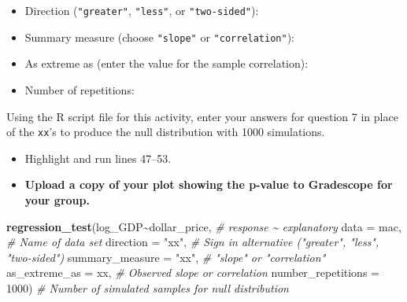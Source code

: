 \documentclass[
]{report}
\newenvironment{Shaded}{\begin{snugshade}}{\end{snugshade}}
\newcommand{\AttributeTok}[1]{\textcolor[rgb]{0.13,0.29,0.53}{#1}}
\newcommand{\CommentTok}[1]{\textcolor[rgb]{0.56,0.35,0.01}{\textit{#1}}}
\newcommand{\DecValTok}[1]{\textcolor[rgb]{0.00,0.00,0.81}{#1}}
\newcommand{\FunctionTok}[1]{\textcolor[rgb]{0.13,0.29,0.53}{\textbf{#1}}}
\newcommand{\NormalTok}[1]{#1}
\newcommand{\SpecialCharTok}[1]{\textcolor[rgb]{0.81,0.36,0.00}{\textbf{#1}}}
\newcommand{\StringTok}[1]{\textcolor[rgb]{0.31,0.60,0.02}{#1}}
\providecommand{\tightlist}{%
  \setlength{\itemsep}{0pt}\setlength{\parskip}{0pt}}
\begin{document}
\vspace{.5 mm}

\begin{itemize}
\tightlist
\item
  Direction (\texttt{"greater"}, \texttt{"less"}, or \texttt{"two-sided"}):
\end{itemize}

\vspace{.2in}

\begin{itemize}
\tightlist
\item
  Summary measure (choose \texttt{"slope"} or \texttt{"correlation"}):
\end{itemize}

\vspace{.2in}

\begin{itemize}
\tightlist
\item
  As extreme as (enter the value for the sample correlation):
\end{itemize}

\vspace{0.2in}

\begin{itemize}
\tightlist
\item
  Number of repetitions:
\end{itemize}

\vspace{.2in}

Using the R script file for this activity, enter your answers for question 7 in place of the \texttt{xx}'s to produce the null distribution with 1000 simulations.

\begin{itemize}
\item
  Highlight and run lines 47--53.
\item
  \textbf{Upload a copy of your plot showing the p-value to Gradescope for your group.}
\end{itemize}

\begin{Shaded}
\begin{Highlighting}[]
\FunctionTok{regression\_test}\NormalTok{(log\_GDP}\SpecialCharTok{\textasciitilde{}}\NormalTok{dollar\_price, }\CommentTok{\# response \textasciitilde{} explanatory}
               \AttributeTok{data =}\NormalTok{ mac, }\CommentTok{\# Name of data set}
               \AttributeTok{direction =} \StringTok{"xx"}\NormalTok{, }\CommentTok{\# Sign in alternative ("greater", "less", "two{-}sided")}
               \AttributeTok{summary\_measure  =} \StringTok{"xx"}\NormalTok{, }\CommentTok{\# "slope" or "correlation"}
               \AttributeTok{as\_extreme\_as =}\NormalTok{ xx, }\CommentTok{\# Observed slope or correlation}
               \AttributeTok{number\_repetitions =} \DecValTok{1000}\NormalTok{) }\CommentTok{\# Number of simulated samples for null distribution}
\end{Highlighting}
\end{Shaded}
\end{document}
